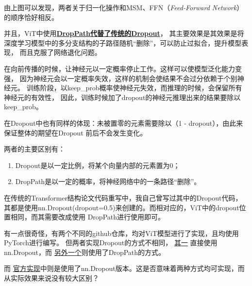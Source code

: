 \documentclass[AutoFakeBold]{MyFormat}
\begin{document}
\par 由上图可以发现，两者关于归一化操作和MSM、FFN（\textit{Feed-Forward Network}）的顺序恰好相反。
\\\hspace*{\fill}
\par 并且，ViT中使用\textbf{\Large \underline{DropPath代替了传统的Dropout}}，
其主要效果是其效果是将深度学习模型中的多分支结构的子路径随机“删除”，可以防止过拟合，提升模型表现，
而且克服了网络退化问题。
\par 在向前传播的时候，让神经元以一定概率停止工作。这样可以使模型泛化能力变强，
因为神经元会以一定概率失效，这样的机制会使结果不会过分依赖于个别神经元。
训练阶段，以keep\_prob概率使神经元失效，而推理的时候，会保留所有神经元的有效性，
因此，训练时候加了dropout的神经元推理出来的结果要除以keep\_prob。
\par 在Dropout中也有同样的体现：未被置零的元素需要除以（1 - dropout），由此来保证整体的期望在Dropout
前后不会发生变化。
\par 两者的主要区别有：
\begin{enumerate}
    \item Dropout是以一定比例，将某个向量内部的元素置为0；
    \item DropPath是以一定的概率，将神经网络中的一条路径“删除”。
\end{enumerate}
\par 在传统的Transformer结构论文代码重写中，我自己曾写过其中的Dropout代码，
其都是使用nn.Dropout(dropout=0.5)来创建的。而相对应的，ViT中的dropout位置相同，而其需要改成使用
DropPath进行使用即可。
\par 有一点很奇怪，有两个不同的github仓库，均对ViT模型进行了实现，且均使用PyTorch进行编写。
但两者实现Dropout的方式不相同，
\href{https://github.com/lucidrains/vit-pytorch#vision-transformer---pytorch}{其一}
直接使用nn.Dropout，而
\href{https://github.com/rwightman/pytorch-image-models/blob/master/timm/models/vision_transformer.py}
{另外一个}则使用了DropPath的方式。
\par 而
\href{https://github.com/google-research/vision_transformer/blob/main/vit\_jax/models\_vit.py}
{官方实现}中则是使用了nn.Dropout版本。这是否意味着两种方式均可实现，而从实际效果来说没有较大区别？
\end{document}
